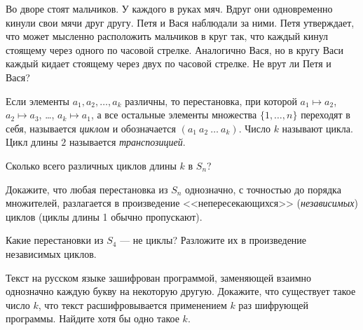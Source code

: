 \documentclass[a4paper,11pt]{article}
\begin{document}

\label{balls}
Во дворе стоят   мальчиков. У каждого в руках мяч. Вдруг они одновременно кинули свои мячи друг другу. Петя и Вася наблюдали за ними. Петя утверждает, что может мысленно расположить мальчиков в круг так, что каждый кинул стоящему через одного по часовой стрелке. Аналогично Вася, но в кругу Васи каждый кидает стоящему через двух по часовой стрелке. Не врут ли Петя и Вася?


Если элементы $a_1,a_2,\dots,a_k$ различны, то перестановка,
при которой $a_1\mapsto a_2$, $a_2\mapsto a_3$, \dots, $a_k\mapsto a_1$,
а все остальные элементы множества $\{1,\dots,n\}$ переходят в себя, называется
\emph{циклом} и обозначается $(a_1\ a_2\ \ldots\ a_k)$.
Число $k$ называют  цикла. Цикл длины $2$ называется {\it транспозицией}.


Сколько всего различных циклов длины $k$ в $S_n$?

Докажите, что любая перестановка из $S_n$ однозначно, с точностью до порядка множителей, разлагается в произведение <<непересекающихся>> ({\em независимых}) циклов (циклы длины 1 обычно пропускают).

Какие перестановки из $S_4$ --- не циклы? Разложите их в произведение независимых циклов.

Текст на русском языке зашифрован программой, заменяющей взаимно однозначно каждую
букву на некоторую другую.
Докажите, что существует такое число $k$, что текст
расшифровывается применением $k$ раз шифрующей программы.
Найдите хотя бы одно такое $k$.
\end{document}
